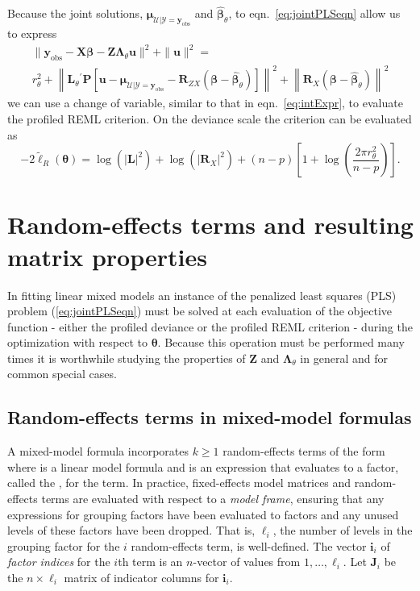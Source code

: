\documentclass{jss}
\newcommand{\bLt}{\ensuremath{\bm\Lambda_\theta}}
\newcommand{\mc}[1]{\ensuremath{\mathcal{#1}}}
\newcommand{\trans}{\ensuremath{^\prime}}
\newcommand{\yobs}{\ensuremath{\bm y_{\mathrm{obs}}}}
\newcommand*{\eq}[1]{eqn.~\ref{#1}}%
\begin{document}
Because the joint solutions, $\bm\mu_{\mc U|\mc Y=\yobs}$ and
$\widehat{\bm\beta}_\theta$, to eqn.~\ref{eq:jointPLSeqn} allow us to express%
\begin{multline}
  \label{eq:PLS2}
  \|\yobs-\bm X\bm\beta-\bm Z\bLt\bm u\|^2+\|\bm u\|^2=\\
  r^2_\theta+
  \left\|\bm L_\theta\trans\bm P\left[\bm u-\bm\mu_{\mc U|\mc Y=\yobs}-
  \bm R_{ZX}(\bm\beta - \widehat{\bm\beta}_\theta)\right]\right\|^2+
  \left\|\bm R_X(\bm\beta - \widehat{\bm\beta}_\theta)\right\|^2
\end{multline}%
we can use a change of variable, similar to that in
\eq{eq:intExpr}, to evaluate the profiled REML criterion.  On the
deviance scale the criterion can be evaluated as%
\begin{equation}
  \label{eq:profiledREML}
  -2\tilde{\ell}_R(\bm\theta)=\log(|\bm L|^2)+\log(|\bm R_X|^2)+
  (n-p)\left[1+\log\left(\frac{2\pi r^2_\theta}{n-p}\right)\right] .
\end{equation}%

\section{Random-effects terms and resulting matrix properties}
\label{sec:PLSnumer}

In fitting linear mixed models an instance of the penalized least
squares (PLS) problem (\ref{eq:jointPLSeqn}) must be solved at each
evaluation of the objective function - either the profiled deviance or
the profiled REML criterion - during the optimization with respect to
$\bm\theta$.  Because this operation must be performed many times it
is worthwhile studying the properties of $\bm Z$ and $\bLt$ in general
and for common special cases.

\subsection{Random-effects terms in mixed-model formulas}
\label{sec:LMMmatrix}

A mixed-model formula incorporates $k\ge1$ random-effects terms of the
form  where  is a linear model formula and
 is an expression that evaluates to a factor, called the
, for the term.  In practice, fixed-effects
model matrices and random-effects terms are evaluated with respect to
a \emph{model frame}, ensuring that any expressions for grouping
factors have been evaluated to factors and any unused levels of these
factors have been dropped.  That is, $\ell_i$, the number of levels in
the grouping factor for the $i$ random-effects term, is well-defined.
The vector $\bm i_i$ of \emph{factor indices} for the $i$th term is an
$n$-vector of values from $1,\dots,\ell_i$.  Let $\bm J_i$ be the
$n\times \ell_i$ matrix of indicator columns for $\bm i_i$.
\end{document}
